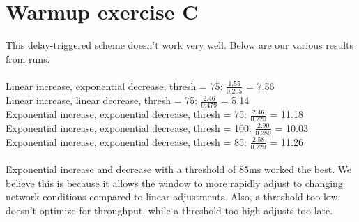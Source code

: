 \documentclass[12pt]{article}
\begin{document}
\section*{Warmup exercise C}
	This delay-triggered scheme doesn't work very well. Below are our various results from runs.
\\
\\
Linear increase, exponential decrease, thresh = 75: $\frac{1.55}{0.205}$ = 7.56 \\
Linear increase, linear decrease, thresh =  75: $\frac{2.46}{0.479}$ = 5.14 \\
Exponential increase, exponential decrease, thresh =  75: $\frac{2.46}{0.220}$ = 11.18 \\
Exponential increase, exponential decrease, thresh =  100: $\frac{2.90}{0.289}$ = 10.03 \\
Exponential increase, exponential decrease, thresh =  85: $\frac{2.58}{0.229}$ = 11.26 \\
\\
Exponential increase and decrease with a threshold of 85ms worked the best. We believe this is because it allows the window to more rapidly adjust to changing network conditions compared to linear adjustments. Also, a threshold too low doesn't optimize for throughput, while a threshold too high adjusts too late. 
\end{document}
